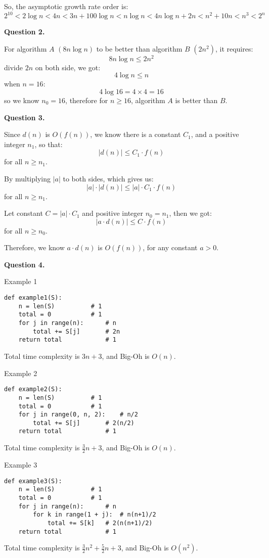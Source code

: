 \documentclass[10pt]{article}
\begin{document}
\begin{singlespace}
So, the asymptotic growth rate order is:
$$2^{10} < 2\log n < 4n < 3n+100\log n < n\log n < 4n\log n+2n < n^2+10n < n^3 < 2^n $$



\noindent \textbf{Question 2.}


\noindent For algorithm $A$ $(8n\log n)$ to be better than algorithm $B$ $(2n^2)$, it requires:
$$8n\log n \le 2n^2$$
divide $2n$ on both side, we got:
$$4\log n \le n$$
when $n=16$:
$$4\log 16=4\times4=16$$
so we know $n_0=16$, therefore for $n\ge 16$, algorithm $A$ is better than $B$.


\pagebreak
\noindent \textbf{Question 3.}


Since $d(n)$ is $O(f(n))$, we know there is a constant $C_1$, and a positive integer $n_1$, so that:
$$|d(n)|\le C_1\cdot f(n)$$ for all $n\ge n_1$.


By multiplying $|a|$ to both sides, which gives us: $$|a|\cdot |d(n)| \le |a|\cdot C_1 \cdot f(n)$$ for all $n\ge n_1$.


Let constant $C=|a|\cdot C_1$ and positive integer $n_0=n_1$, then we got:
$$|a\cdot d(n)|\le C\cdot f(n)$$ for all $n\ge n_0$.


Therefore, we know $a\cdot d(n)$ is $O(f(n))$, for any constant $a>0$.





\noindent \textbf{Question 4.}


\noindent Example 1

\begin{lstlisting}
def example1(S):
	n = len(S)			# 1
	total = 0			# 1
	for j in range(n):		# n
		total += S[j]		# 2n
	return total			# 1
\end{lstlisting}
Total time complexity is $3n+3$, and Big-Oh is $O(n)$.


\noindent Example 2

\begin{lstlisting}
def example2(S):
	n = len(S)			# 1
	total = 0			# 1
	for j in range(0, n, 2):	# n/2
		total += S[j]		# 2(n/2)
	return total			# 1
\end{lstlisting}
Total time complexity is $\displaystyle \frac{3}{2}n+3$, and Big-Oh is $O(n)$.

\pagebreak

\noindent Example 3

\begin{lstlisting}
def example3(S):
	n = len(S)			# 1
	total = 0			# 1
	for j in range(n):		# n
		for k in range(1 + j):	# n(n+1)/2
			total += S[k]	# 2(n(n+1)/2)
	return total			# 1
\end{lstlisting}
Total time complexity is $\displaystyle \frac{3}{2}n^2+\frac{5}{2}n+3$, and Big-Oh is $O(n^2)$.



\end{singlespace}
\end{document}
